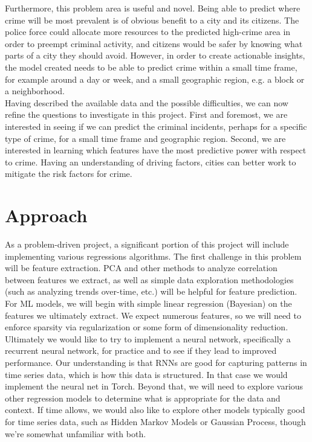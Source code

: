 \documentclass[10pt]{article}
\begin{document}
  Furthermore, this problem area is useful and novel. Being able to predict where crime will be most prevalent is of obvious benefit to a city and its citizens. The police force could allocate more resources to the predicted high-crime area in order to preempt criminal activity, and citizens would be safer by knowing what parts of a city they should avoid. However, in order to create actionable insights, the model created needs to be able to predict crime within a small time frame, for example around a day or week, and a small geographic region, e.g. a block or a neighborhood. \\

  Having described the available data and the possible difficulties, we can now refine the questions to investigate in this project. First and foremost, we are interested in seeing if we can predict the criminal incidents, perhaps for a specific type of crime, for a small time frame and geographic region. Second, we are interested in learning which features have the most predictive power with respect to crime. Having an understanding of driving factors, cities can better work to mitigate the risk factors for crime.

\section{Approach}
  As a problem-driven project, a significant portion of this project will include implementing various regressions algorithms. The first challenge in this problem will be feature extraction. PCA and other methods to analyze correlation between features we extract, as well as simple data exploration methodologies (such as analyzing trends over-time, etc.) will be helpful for feature prediction. \\

  For ML models, we will begin with simple linear regression (Bayesian) on the features we ultimately extract. We expect numerous features, so we will need to enforce sparsity via regularization or some form of dimensionality reduction. Ultimately we would like to try to implement a neural network, specifically a recurrent neural network, for practice and to see if they lead to improved performance. Our understanding is that RNNs are good for capturing patterns in time series data, which is how this data is structured. In that case we would implement the neural net in Torch. Beyond that, we will need to explore various other regression models to determine what is appropriate for the data and context. If time allows, we would also like to explore other models typically good for time series data, such as Hidden Markov Models or Gaussian Process, though we're somewhat unfamiliar with both. \\
\end{document}

